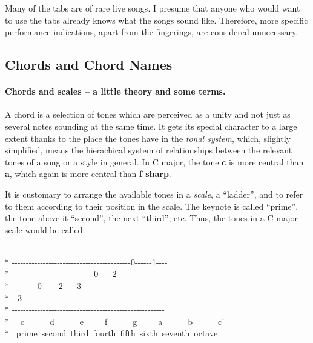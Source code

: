 \begin{articlelayout}
Many of the tabs are of rare live songs. I presume that anyone who
would want to use the tabs already knows what the songs sound
like. Therefore, more specific performance indications, apart from the
fingerings, are considered unnecessary.

\subsection*{Chords and Chord Names}

\paragraph*{Chords and scales -- a little theory and some terms.} A
chord is a selection of tones which are perceived as a unity and not
just as several notes sounding at the same time. It gets its special
character to a large extent thanks to the place the tones have in the
\emph{tonal system}, which, slightly simplified, means the hierachical
system of relationships between the relevant tones of a song or a
style in general. In C major, the tone \textbf{c} is more central than
\textbf{a}, which again is more central than \textbf{f sharp}.

It is customary to arrange the available tones in a \emph{scale}, a
``{}ladder''{}, and to refer to them according to their position in
the scale. The keynote is called ``{}prime''{}, the tone above it
``{}second''{}, the next ``{}third''{}, etc. Thus, the tones in a C
major scale would be called:
\begin{pre}\begin{adjustwidth}{2em}{0em}
{-}{-}{-}{-}{-}{-}{-}{-}{-}{-}{-}{-}{-}{-}{-}{-}{-}{-}{-}{-}{-}{-}{-}{-}{-}{-}{-}{-}{-}{-}{-}{-}{-}{-}{-}{-}{-}{-}{-}{-}{-}{-}{-}{-}{-}{-}{-}{-}{-}{-}{-}{-}{-}{-}\\*
{-}{-}{-}{-}{-}{-}{-}{-}{-}{-}{-}{-}{-}{-}{-}{-}{-}{-}{-}{-}{-}{-}{-}{-}{-}{-}{-}{-}{-}{-}{-}{-}{-}{-}{-}{-}{-}{-}{-}{-}{-}{-}0{-}{-}{-}{-}{-}{-}1{-}{-}{-}{-}\\*
{-}{-}{-}{-}{-}{-}{-}{-}{-}{-}{-}{-}{-}{-}{-}{-}{-}{-}{-}{-}{-}{-}{-}{-}{-}{-}{-}{-}-0{-}{-}{-}{-}-2{-}{-}{-}{-}{-}{-}{-}{-}{-}{-}{-}{-}{-}{-}{-}{-}{-}{-}\\*
{-}{-}{-}{-}{-}{-}{-}{-}-0{-}{-}{-}{-}{-}{-}2{-}{-}{-}{-}-3{-}{-}{-}{-}{-}{-}{-}{-}{-}{-}{-}{-}{-}{-}{-}{-}{-}{-}{-}{-}{-}{-}{-}{-}{-}{-}{-}{-}{-}{-}-\\*
{-}{-}3{-}{-}{-}{-}{-}{-}{-}{-}{-}{-}{-}{-}{-}{-}{-}{-}{-}{-}{-}{-}{-}{-}{-}{-}{-}{-}{-}{-}{-}{-}{-}{-}{-}{-}{-}{-}{-}{-}{-}{-}{-}{-}{-}{-}{-}{-}{-}{-}{-}{-}-\\*
{-}{-}{-}{-}{-}{-}{-}{-}{-}{-}{-}{-}{-}{-}{-}{-}{-}{-}{-}{-}{-}{-}{-}{-}{-}{-}{-}{-}{-}{-}{-}{-}{-}{-}{-}{-}{-}{-}{-}{-}{-}{-}{-}{-}{-}{-}{-}{-}{-}{-}{-}{-}{-}{-}\\*
~~c~~~~~~d~~~~~~e~~~~~f~~~~~~g~~~~~a~~~~~~b~~~~~~c'\\*
~prime~second~third~fourth~fifth~sixth~seventh~octave
\end{adjustwidth}\end{pre}


\end{articlelayout}
